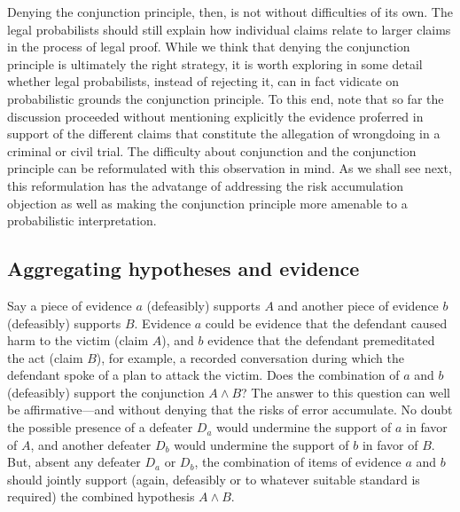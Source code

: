 \documentclass[10pt,dvipsnames,enabledeprecatedfontcommands]{scrartcl}
\newcommand{\et}{\wedge}
\begin{document}
Denying the conjunction principle, then, is not without difficulties of
its own. The legal probabilists should still explain how individual
claims relate to larger claims in the process of legal proof. While we
think that denying the conjunction principle is ultimately the right
strategy,
it is worth exploring in some detail whether legal probabilists, instead
of rejecting it, can in fact vidicate on probabilistic grounds the
conjunction principle. To this end, note that so far the discussion
proceeded without mentioning explicitly the evidence proferred in
support of the different claims that constitute the allegation of
wrongdoing in a criminal or civil trial. The difficulty about
conjunction and the conjunction principle can be reformulated with this
observation in
mind. As we
shall see next, this reformulation has the advatange of addressing the
risk accumulation objection as well as making the conjunction principle
more amenable to a probabilistic interpretation.

\hypertarget{aggregating-hypotheses-and-evidence}{%
\subsection{Aggregating hypotheses and
evidence}\label{aggregating-hypotheses-and-evidence}}

Say a piece of evidence \(a\) (defeasibly) supports \(A\) and another
piece of evidence \(b\) (defeasibly) supports \(B\). Evidence \(a\)
could be evidence that the defendant caused harm to the victim (claim
\(A\)), and \(b\) evidence that the defendant premeditated the act
(claim \(B\)), for example, a recorded conversation during which the
defendant spoke of a plan to attack the victim. Does the combination of
\(a\) and \(b\) (defeasibly) support the conjunction \(A \et B\)? The
answer to this question can well be affirmative---and without denying
that the risks of error accumulate. No doubt the possible presence of a
defeater \(D_a\) would undermine the support of \(a\) in favor of \(A\),
and another defeater \(D_b\) would undermine the support of \(b\) in
favor of \(B\). But, absent any defeater \(D_a\) or \(D_b\), the
combination of items of evidence \(a\) and \(b\) should jointly support
(again, defeasibly or to whatever suitable standard is required) the
combined hypothesis \(A \wedge B\).
\end{document}
